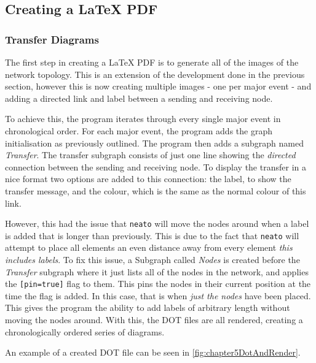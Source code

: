 \subsection{Creating a LaTeX PDF}
\subsubsection{Transfer Diagrams}
The first step in creating a LaTeX PDF is to generate all of the images of the network topology.
This is an extension of the development done in the previous section, however this is now creating multiple images - one per major event - and adding a directed link and label between a sending and receiving node.

To achieve this, the program iterates through every single major event in chronological order.
For each major event, the program adds the graph initialisation as previously outlined.
The program then adds a subgraph named \emph{Transfer}.
The transfer subgraph consists of just one line showing the \emph{directed} connection between the sending and receiving node.
To display the transfer in a nice format two options are added to this connection: the label, to show the transfer message, and the colour, which is the same as the normal colour of this link.


However, this had the issue that \verb|neato| will move the nodes around when a label is added that is longer than previously.
This is due to the fact that \verb|neato| will attempt to place all elements an even distance away from every element \emph{this includes labels}. 
To fix this issue, a Subgraph called \emph{Nodes} is created before the \emph{Transfer} subgraph where it just lists all of the nodes in the network, and applies the \verb|[pin=true]| flag to them.
This pins the nodes in their current position at the time the flag is added.
In this case, that is when \emph{just the nodes} have been placed.
This gives the program the ability to add labels of arbitrary length without moving the nodes around.
With this, the DOT files are all rendered, creating a chronologically ordered series of diagrams.

An example of a created DOT file can be seen in \figurename{ \ref{fig:chapter5DotAndRender}}.

